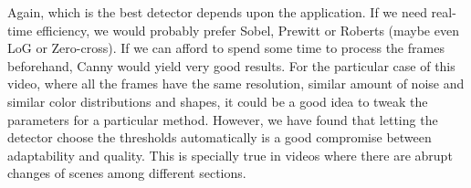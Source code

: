 Again, which is the best detector depends upon the application. If we need
real-time efficiency, we would probably prefer Sobel, Prewitt or Roberts
(maybe even LoG or Zero-cross). If we can afford to
spend some time to process the frames beforehand, Canny would yield very good
results. For the particular case of this video, where all the frames have the same
resolution, similar amount of noise and similar color distributions and shapes, it
could be a good idea to tweak the parameters for a particular method. However,
we have found that letting the detector choose the thresholds automatically is
a good compromise between adaptability and quality. This is specially true in
videos where there are abrupt changes of scenes among different sections.
